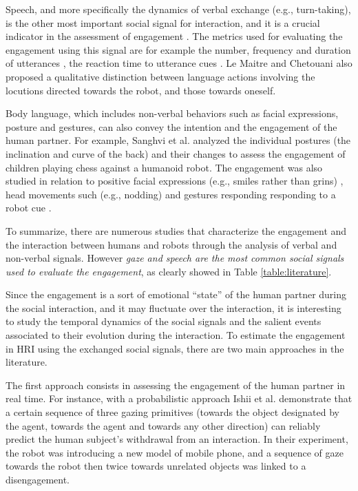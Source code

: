 \documentclass[twocolumn]{svjour3}          %
\begin{document}
Speech, and more specifically the dynamics of verbal exchange (e.g., turn-taking), is the other most important social signal for interaction, and it is a crucial indicator in the assessment of engagement \cite{Lemaitre2013,rich2010recognizing}. The metrics used for evaluating the engagement using this signal are for example the number, frequency and duration of utterances \cite{Iishi2011,rich2010recognizing}, the reaction time to utterance cues \cite{ivaldi2014frontiers}. Le Maitre and Chetouani \cite{Lemaitre2013} also proposed a qualitative distinction between language actions involving the locutions directed towards the robot, and those towards oneself.


Body language, which includes non-verbal behaviors such as facial expressions, posture and gestures, can also convey the intention and the engagement of the human partner. 
For example, Sanghvi et al. \cite{Sanghvi2011} analyzed the individual postures (the inclination and curve of the back) and their changes to assess the engagement of children playing chess against a humanoid robot.
The engagement was also studied in relation to positive facial expressions (e.g., smiles rather than grins) \cite{Castellano2009}, head movements such (e.g., nodding) \cite{Sidner2006} and gestures responding responding to a robot cue \cite{rich2010recognizing}.


To summarize, there are numerous studies that characterize the engagement and the interaction between humans and robots through the analysis of verbal and non-verbal signals. However \emph{gaze and speech are the most common social signals used to evaluate the engagement}, as clearly showed in Table \ref{table:literature}.

Since the engagement is a sort of emotional ``state'' of the human partner during the social interaction, and it may fluctuate over the interaction, it is interesting to study the  temporal dynamics of the social signals and the salient events associated to their evolution during the interaction. 
To estimate the engagement in HRI using the exchanged social signals, there are two main approaches in the literature.

The first approach consists in assessing the engagement of the human partner in real time. For instance, with a probabilistic approach Ishii et al. \cite{Iishi2011} demonstrate that a certain sequence of three gazing primitives (towards the object designated by the agent, towards the agent and towards any other direction) can reliably predict the human subject's withdrawal from an interaction. 
In their experiment, the robot was introducing a new model of mobile phone, and a sequence of gaze towards the robot then twice towards unrelated objects was linked to a disengagement.
 
\end{document}
